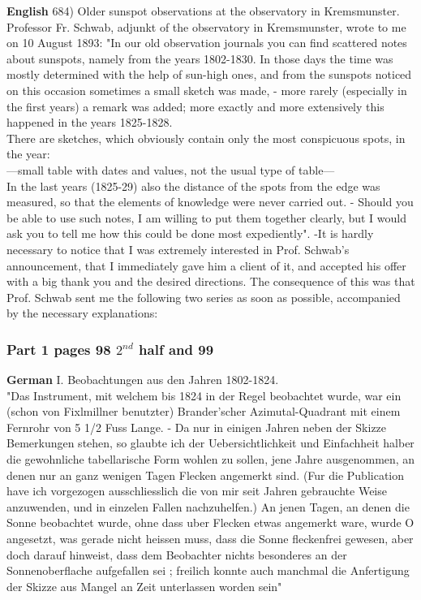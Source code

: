 \documentclass[12pt]{article}
\begin{document}
\textbf{English}
684) Older sunspot observations at the observatory in Kremsmunster.\\

Professor Fr. Schwab, adjunkt of the observatory in Kremsmunster, wrote to me on 10 August 1893: "In our old observation journals you can find scattered notes about sunspots, namely from the years 1802-1830. In those days the time was mostly determined with the help of sun-high ones, and from the sunspots noticed on this occasion sometimes a small sketch was made, - more rarely (especially in the first years) a remark was added; more exactly and more extensively this happened in the years 1825-1828.\\

There are sketches, which obviously contain only the most conspicuous spots, in the year: \\

---small table with dates and values, not the usual type of table---\\

In the last years (1825-29) also the distance of the spots from the edge was measured, so that the elements of knowledge were never carried out. - Should you be able to use such notes, I am willing to put them together clearly, but I would ask you to tell me how this could be done most expediently". 
-It is hardly necessary to notice that I was extremely interested in Prof. Schwab's announcement, that I immediately gave him a client of it, and accepted his offer with a big thank you and the desired directions. The consequence of this was that Prof. Schwab sent me the following two series as soon as possible, accompanied by the necessary explanations:\\

\subsubsection{Part 1 pages 98 $2^{nd}$ half and 99}\label{mitt:rub 684 part 1}
\textbf{German}
I. Beobachtungen aus den Jahren 1802-1824.\\

"Das Instrument, mit welchem bis 1824 in der Regel beobachtet wurde, war ein (schon von Fixlmillner benutzter) Brander'scher Azimutal-Quadrant mit einem Fernrohr von 5 1/2 Fuss Lange. - Da nur in einigen Jahren neben der Skizze Bemerkungen stehen, so glaubte ich der Uebersichtlichkeit und Einfachheit halber die gewohnliche tabellarische Form wohlen zu sollen, jene Jahre ausgenommen, an denen nur an ganz wenigen Tagen Flecken angemerkt sind. (Fur die Publication have ich vorgezogen ausschliesslich die von mir seit Jahren gebrauchte Weise anzuwenden, und in einzelen Fallen nachzuhelfen.) An jenen Tagen, an denen die Sonne beobachtet wurde, ohne dass uber Flecken etwas angemerkt ware, wurde O angesetzt, was gerade nicht heissen muss, dass die Sonne fleckenfrei gewesen, aber doch darauf hinweist, dass dem Beobachter nichts besonderes an der Sonnenoberflache aufgefallen sei ; freilich konnte auch manchmal die Anfertigung der Skizze aus Mangel an Zeit unterlassen worden sein"\\
\end{document}
